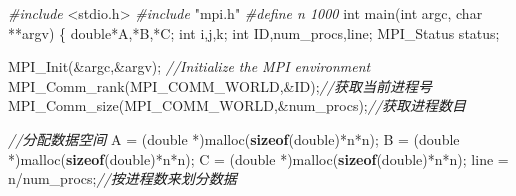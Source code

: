 \documentclass[]{ctexbook}
\newenvironment{Shaded}{\begin{snugshade}}{\end{snugshade}}
\newcommand{\CommentTok}[1]{\textcolor[rgb]{0.56,0.35,0.01}{\textit{#1}}}
\newcommand{\DataTypeTok}[1]{\textcolor[rgb]{0.13,0.29,0.53}{#1}}
\newcommand{\ImportTok}[1]{#1}
\newcommand{\KeywordTok}[1]{\textcolor[rgb]{0.13,0.29,0.53}{\textbf{#1}}}
\newcommand{\NormalTok}[1]{#1}
\newcommand{\PreprocessorTok}[1]{\textcolor[rgb]{0.56,0.35,0.01}{\textit{#1}}}
\begin{document}
\begin{Shaded}
\begin{Highlighting}[]
\PreprocessorTok{\#include }\ImportTok{\textless{}stdio.h\textgreater{}}
\PreprocessorTok{\#include }\ImportTok{"mpi.h"}
\PreprocessorTok{\#define n 1000}
\DataTypeTok{int}\NormalTok{ main(}\DataTypeTok{int}\NormalTok{ argc, }\DataTypeTok{char}\NormalTok{ **argv)}
\NormalTok{\{}
    \DataTypeTok{double}\NormalTok{*A,*B,*C;}
    \DataTypeTok{int}\NormalTok{ i,j,k;}
    \DataTypeTok{int}\NormalTok{ ID,num\_procs,line;}
\NormalTok{    MPI\_Status status;}

\NormalTok{    MPI\_Init(\&argc,\&argv); }\CommentTok{//Initialize the MPI environment}
\NormalTok{    MPI\_Comm\_rank(MPI\_COMM\_WORLD,\&ID);}\CommentTok{//获取当前进程号}
\NormalTok{    MPI\_Comm\_size(MPI\_COMM\_WORLD,\&num\_procs);}\CommentTok{//获取进程数目}

    \CommentTok{//分配数据空间}
\NormalTok{    A = (}\DataTypeTok{double}\NormalTok{ *)malloc(}\KeywordTok{sizeof}\NormalTok{(}\DataTypeTok{double}\NormalTok{)*n*n);}
\NormalTok{    B = (}\DataTypeTok{double}\NormalTok{ *)malloc(}\KeywordTok{sizeof}\NormalTok{(}\DataTypeTok{double}\NormalTok{)*n*n);}
\NormalTok{    C = (}\DataTypeTok{double}\NormalTok{ *)malloc(}\KeywordTok{sizeof}\NormalTok{(}\DataTypeTok{double}\NormalTok{)*n*n);}
\NormalTok{    line = n/num\_procs;}\CommentTok{//按进程数来划分数据}


\end{Highlighting}
\end{Shaded}
\end{document}
